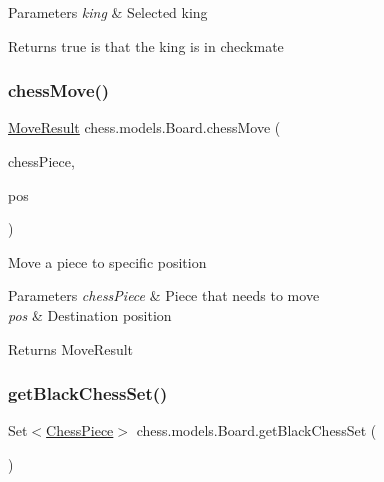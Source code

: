 \begin{DoxyParams}{Parameters}
{\em king} & Selected king \\
\hline
\end{DoxyParams}
\begin{DoxyReturn}{Returns}
true is that the king is in checkmate 
\end{DoxyReturn}
\mbox{\label{classchess_1_1models_1_1_board_a013a001cb8edfdd61272275d210609fd}} 
\subsubsection{\texorpdfstring{chess\+Move()}{chessMove()}}
{\footnotesize\ttfamily \mbox{\hyperlink{enumchess_1_1models_1_1enums_1_1_move_result}{Move\+Result}} chess.\+models.\+Board.\+chess\+Move (\begin{DoxyParamCaption}\item[{\mbox{\hyperlink{classchess_1_1models_1_1_chess_piece}{Chess\+Piece}}}]{chess\+Piece,  }\item[{\mbox{\hyperlink{classchess_1_1models_1_1_position}{Position}}}]{pos }\end{DoxyParamCaption})}

Move a piece to specific position


\begin{DoxyParams}{Parameters}
{\em chess\+Piece} & Piece that needs to move \\
\hline
{\em pos} & Destination position \\
\hline
\end{DoxyParams}
\begin{DoxyReturn}{Returns}
Move\+Result 
\end{DoxyReturn}
\mbox{\label{classchess_1_1models_1_1_board_a4dcc35426fd6ebe9725b2edaa4752310}} 
\subsubsection{\texorpdfstring{get\+Black\+Chess\+Set()}{getBlackChessSet()}}
{\footnotesize\ttfamily Set$<$\mbox{\hyperlink{classchess_1_1models_1_1_chess_piece}{Chess\+Piece}}$>$ chess.\+models.\+Board.\+get\+Black\+Chess\+Set (\begin{DoxyParamCaption}{ }\end{DoxyParamCaption})}

